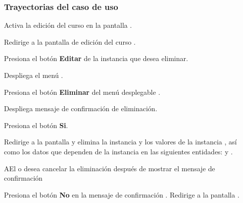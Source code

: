 \subsubsection{Trayectorias del caso de uso}

\begin{UCtrayectoria}%
%

    \Actor Activa la edición del curso en la pantalla .

    \Sistema Redirige a la pantalla de edición del curso .

    \Actor Presiona el botón {\bf Editar} de la instancia que desea eliminar.

    \Sistema Despliega el menú .

    \Actor Presiona el botón {\bf Eliminar} del menú desplegable .

    \Sistema Despliega mensaje de confirmación de eliminación. 

    \Actor Presiona el botón {\bf Si}. 

    \Sistema Redirige a la pantalla  y elimina la instancia y los valores de la instancia , así como los datos que dependen de la instancia en las siguientes entidades:  y .

\end{UCtrayectoria}

\begin{UCtrayectoriaA}{A}{El  o  desea cancelar la eliminación después de mostrar el mensaje de confirmación}

  \Actor Presiona el botón {\bf No} en la mensaje de confirmación .
  \Sistema Redirige a la pantalla .

\end{UCtrayectoriaA}
